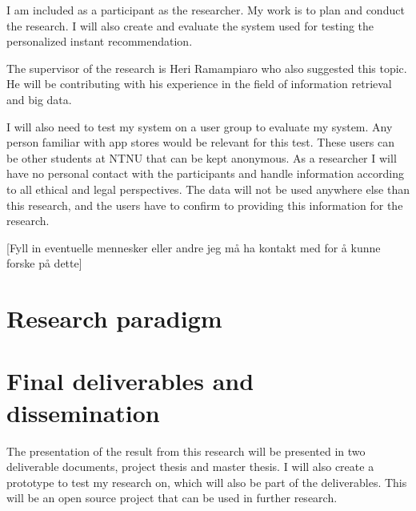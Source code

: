   I am included as a participant as the researcher. My work is to plan and conduct the research. I will also create and evaluate the system used for testing the personalized instant recommendation.

  The supervisor of the research is Heri Ramampiaro who also suggested this topic. He will be contributing with his experience in the field of information retrieval and big data.

  I will also need to test my system on a user group to evaluate my system. Any person familiar with app stores would be relevant for this test. These users can be other students at NTNU that can be kept anonymous. As a researcher I will have no personal contact with the participants and handle information according to all ethical and legal perspectives. The data will not be used anywhere else than this research, and the users have to confirm to providing this information for the research.

  [Fyll in eventuelle mennesker eller andre jeg må ha kontakt med for å kunne forske på dette]

  \section*{Research paradigm} %

  \section*{Final deliverables and dissemination} %

    The presentation of the result from this research will be presented in two deliverable documents, project thesis and master thesis. I will also create a prototype to test my research on, which will also be part of the deliverables. This will be an open source project that can be used in further research.
    

